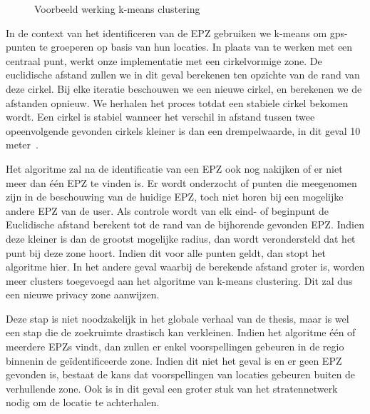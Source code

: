 \begin{figure}[h]
\begin{subfigure}[b]{.33\textwidth}
    \end{subfigure}
    \caption{Voorbeeld werking k-means clustering~\cite{InDepthk59:online}}\label{fig:kmeans}
\end{figure}

In de context van het identificeren van de \ac{EPZ} gebruiken we k-means om
\ac{gps}-punten te groeperen op basis van hun locaties. In plaats van te werken
met een centraal punt, werkt onze implementatie met een cirkelvormige zone. De
euclidische afstand zullen we in dit geval berekenen ten opzichte van de rand
van deze cirkel. Bij elke iteratie beschouwen we een nieuwe cirkel, en
berekenen we de afstanden opnieuw. We herhalen het proces totdat een stabiele
cirkel bekomen wordt. Een cirkel is stabiel wanneer het verschil in afstand
tussen twee opeenvolgende gevonden cirkels kleiner is dan een drempelwaarde, in
dit geval 10 meter~\cite{Dhondt, Verdonck_2022}.

Het algoritme zal na de identificatie van een \ac{EPZ} ook nog nakijken of er
niet meer dan één \ac{EPZ} te vinden is. Er wordt onderzocht of punten die
meegenomen zijn in de beschouwing van de huidige \ac{EPZ}, toch niet horen bij
een mogelijke andere \ac{EPZ} van de user. Als controle wordt van elk eind- of
beginpunt de Euclidische afstand berekent tot de rand van de bijhorende
gevonden \ac{EPZ}. Indien deze kleiner is dan de grootst mogelijke radius, dan
wordt verondersteld dat het punt bij deze zone hoort. Indien dit voor alle
punten geldt, dan stopt het algoritme hier. In het andere geval waarbij de
berekende afstand groter is, worden meer clusters toegevoegd aan het algoritme
van k-means clustering. Dit zal dus een nieuwe privacy zone aanwijzen.

Deze stap is niet noodzakelijk in het globale verhaal van de thesis, maar is
wel een stap die de zoekruimte drastisch kan verkleinen. Indien het algoritme
één of meerdere \acp{EPZ} vindt, dan zullen er enkel voorspellingen gebeuren in
de regio binnenin de geïdentificeerde zone. Indien dit niet het geval is en er
geen \ac{EPZ} gevonden is, bestaat de kans dat voorspellingen van locaties
gebeuren buiten de verhullende zone. Ook is in dit geval een groter stuk van
het stratennetwerk nodig om de locatie te achterhalen.

